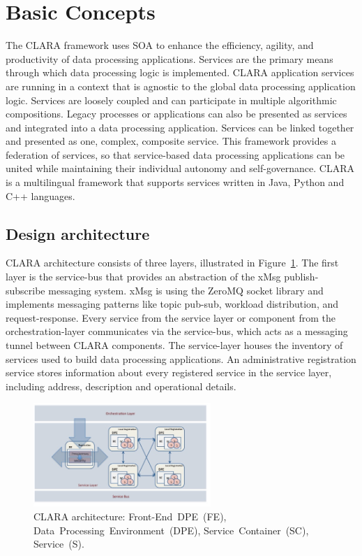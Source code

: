 \documentclass[a4paper]{jpconf}
\begin{document}
\section{Basic Concepts}

The CLARA framework uses SOA\cite{soa} to enhance
the efficiency, agility, and productivity of data processing applications.
Services are the primary means through which
data processing logic is implemented.
CLARA application services are running in a context that is agnostic
to the global data processing application logic.
Services are loosely coupled
and can participate in multiple algorithmic compositions.
Legacy processes or applications can also be presented as services
and integrated into a data processing application.
Services can be linked together
and presented as one, complex, composite service.
This framework provides a federation of services,
so that service-based data processing applications can be united
while maintaining their individual autonomy and self-governance.
CLARA is a multilingual framework that supports services
written in Java, Python and C++ languages.

\subsection{Design architecture}

CLARA architecture consists of three layers,
illustrated in Figure~\ref{fig:design}.
The first layer is the service-bus that provides an abstraction
of the xMsg publish-subscribe messaging system\cite{xmsg}.
xMsg is using the ZeroMQ\cite{zmq} socket library
and implements messaging patterns like
topic pub-sub, workload distribution, and request-response.
Every service from the service layer
or component from the orchestration-layer
communicates via the service-bus,
which acts as a messaging tunnel between CLARA components.
The service-layer houses the inventory of services
used to build data processing applications.
An administrative registration service stores information
about every registered service in the service layer,
including address, description and operational details.

\begin{figure}[!h]
  \begin{center}
    \includegraphics[width=0.6\textwidth]{figures/design}
  \end{center}
  \caption{CLARA architecture:
    Front-End~DPE~(FE),
    Data~Processing~Environment~(DPE),
    Service~Container~(SC),
    Service~(S).}
  \label{fig:design}
\end{figure}
\end{document}
